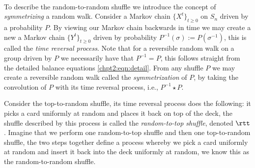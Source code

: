 \documentclass[11pt]{report}
\begin{document}
\paragraph{}
To describe the random-to-random shuffle we introduce the concept of 
\emph{symmetrizing} a random walk. Consider a Markov chain $\{X^{t}\}_{t\geq 0}$ on 
$S_{n}$ driven by a probability $P$. By viewing our Markov chain backwards in time we may create a new a Markov chain $\{Y^{t}\}_{t\geq 0}$ driven by probability $P^{-1}(\sigma) := P(\sigma^{-1})$, this is called the \emph{time reversal process}.
Note that for a reversible random walk on a group driven by $P$ we necessarily have that $P^{-1}=P$, this follows straight from the detailed balance equations \eqref{chpt2:eqn:detail}. From any shuffle $P$ we may create a reversible random walk called the \emph{symmetrization} of $P$,  by taking the convolution of $P$ with its time reversal process, i.e., $P^{-1} \star P$.

Consider the top-to-random shuffle, its time reversal process does the following: it picks a card uniformly at random and places it back on top of the deck, the shuffle described by this process is called the \emph{random-to-top shuffle}, denoted $\rtt$. Imagine that we perform one random-to-top shuffle and then one top-to-random shuffle, the two steps together define a process whereby we pick a card uniformly at random and insert it back into the deck uniformly at random, we know this as the random-to-random shuffle.
\end{document}
